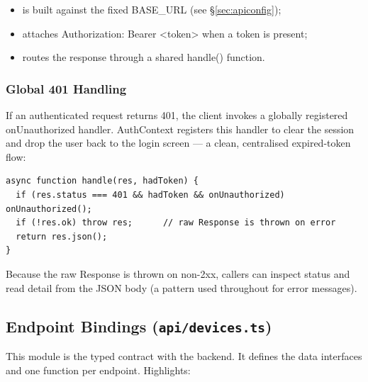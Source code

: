 \documentclass[11pt,a4paper]{article}
\newcommand{\code}[1]{\colorbox{codebg}{\ttfamily\small #1}}
\begin{document}
\begin{itemize}[leftmargin=1.4em]
  \item is built against the fixed \code{BASE\_URL} (see \S\ref{sec:apiconfig});
  \item attaches \code{Authorization: Bearer <token>} when a token is present;
  \item routes the response through a shared \code{handle()} function.
\end{itemize}

\subsubsection{Global 401 Handling}

If an authenticated request returns \code{401}, the client invokes a globally
registered \code{onUnauthorized} handler. \code{AuthContext} registers this
handler to clear the session and drop the user back to the login screen — a
clean, centralised expired-token flow:

\begin{lstlisting}[language=tsx]
async function handle(res, hadToken) {
  if (res.status === 401 && hadToken && onUnauthorized) onUnauthorized();
  if (!res.ok) throw res;      // raw Response is thrown on error
  return res.json();
}
\end{lstlisting}

Because the raw \code{Response} is thrown on non-2xx, callers can inspect
\code{status} and read \code{detail} from the JSON body (a pattern used
throughout for error messages).

\subsection{Endpoint Bindings (\texttt{api/devices.ts})}

This module is the typed contract with the backend. It defines the data
interfaces and one function per endpoint. Highlights:
\end{document}
